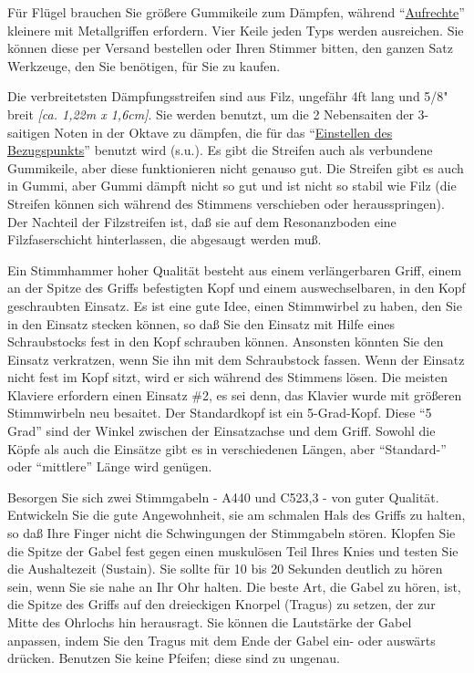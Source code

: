 Für Flügel brauchen Sie größere Gummikeile zum Dämpfen, während \enquote{\hyperlink{upright}{Aufrechte}} kleinere mit Metallgriffen erfordern.
 Vier Keile jeden Typs werden ausreichen.
 Sie können diese per Versand bestellen oder Ihren Stimmer bitten, den ganzen Satz Werkzeuge, den Sie benötigen, für Sie zu kaufen.
 

Die verbreitetsten Dämpfungsstreifen sind aus Filz, ungefähr 4ft lang und 5/8" breit \textit{[ca. 1,22m x 1,6cm]}.
 Sie werden benutzt, um die 2 Nebensaiten der 3-saitigen Noten in der Oktave zu dämpfen, die für das \enquote{\hyperlink{c2_4}{Einstellen des Bezugspunkts}} benutzt wird (s.u.).
 Es gibt die Streifen auch als verbundene Gummikeile, aber diese funktionieren nicht genauso gut.
 Die Streifen gibt es auch in Gummi, aber Gummi dämpft nicht so gut und ist nicht so stabil wie Filz (die Streifen können sich während des Stimmens verschieben oder herausspringen).
 Der Nachteil der Filzstreifen ist, daß sie auf dem Resonanzboden eine Filzfaserschicht hinterlassen, die abgesaugt werden muß.
 

Ein Stimmhammer hoher Qualität besteht aus einem verlängerbaren Griff, einem an der Spitze des Griffs befestigten Kopf und einem auswechselbaren, in den Kopf geschraubten Einsatz.
 Es ist eine gute Idee, einen Stimmwirbel zu haben, den Sie in den Einsatz stecken können, so daß Sie den Einsatz mit Hilfe eines Schraubstocks fest in den Kopf schrauben können.
 Ansonsten könnten Sie den Einsatz verkratzen, wenn Sie ihn mit dem Schraubstock fassen.
 Wenn der Einsatz nicht fest im Kopf sitzt, wird er sich während des Stimmens lösen.
 Die meisten Klaviere erfordern einen Einsatz \#2, es sei denn, das Klavier wurde mit größeren Stimmwirbeln neu besaitet.
 Der Standardkopf ist ein 5-Grad-Kopf.
 Diese \enquote{5 Grad} sind der Winkel zwischen der Einsatzachse und dem Griff.
 Sowohl die Köpfe als auch die Einsätze gibt es in verschiedenen Längen, aber \enquote{Standard-} oder \enquote{mittlere} Länge wird genügen.
 \hypertarget{c2_3_gabel}{}

Besorgen Sie sich zwei Stimmgabeln - A440 und C523,3 - von guter Qualität.
 Entwickeln Sie die gute Angewohnheit, sie am schmalen Hals des Griffs zu halten, so daß Ihre Finger nicht die Schwingungen der Stimmgabeln stören.
 Klopfen Sie die Spitze der Gabel fest gegen einen muskulösen Teil Ihres Knies und testen Sie die Aushaltezeit (Sustain).
 Sie sollte für 10 bis 20 Sekunden deutlich zu hören sein, wenn Sie sie nahe an Ihr Ohr halten.
 Die beste Art, die Gabel zu hören, ist, die Spitze des Griffs auf den dreieckigen Knorpel (Tragus) zu setzen, der zur Mitte des Ohrlochs hin herausragt.
 Sie können die Lautstärke der Gabel anpassen, indem Sie den Tragus mit dem Ende der Gabel ein- oder auswärts drücken.
 Benutzen Sie keine Pfeifen; diese sind zu ungenau.
 

